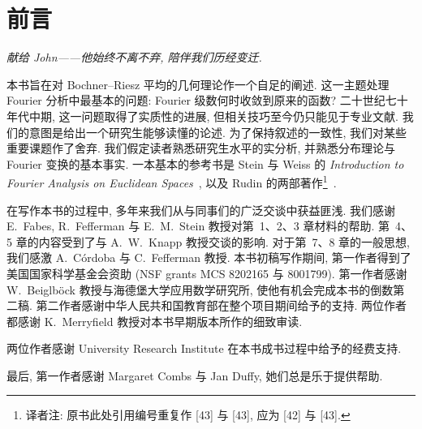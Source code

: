 \chapter*{前言}

\begin{center}
\itshape 献给 John——他始终不离不弃, 陪伴我们历经变迁.
\end{center}

\vspace{2em}

本书旨在对 Bochner--Riesz 平均的几何理论作一个自足的阐述. 这一主题处理 Fourier 分析中最基本的问题: Fourier 级数何时收敛到原来的函数? 二十世纪七十年代中期, 这一问题取得了实质性的进展, 但相关技巧至今仍只能见于专业文献. 我们的意图是给出一个研究生能够读懂的论述. 为了保持叙述的一致性, 我们对某些重要课题作了舍弃. 我们假定读者熟悉研究生水平的实分析, 并熟悉分布理论与 Fourier 变换的基本事实. 一本基本的参考书是 Stein 与 Weiss 的 \emph{Introduction to Fourier Analysis on Euclidean Spaces}~\cite{steinweiss}, 以及 Rudin 的两部著作\footnote{译者注: 原书此处引用编号重复作 [43] 与 [43], 应为 [42] 与 [43].}~\cite{rudinrca,rudinfa}.

在写作本书的过程中, 多年来我们从与同事们的广泛交谈中获益匪浅. 我们感谢 E.~Fabes, R.~Fefferman 与 E.~M.~Stein 教授对第~1、2、3 章材料的帮助. 第~4、5 章的内容受到了与 A.~W.~Knapp 教授交谈的影响. 对于第~7、8 章的一般思想, 我们感激 A.~Córdoba 与 C.~Fefferman 教授. 本书初稿写作期间, 第一作者得到了美国国家科学基金会资助 (NSF grants MCS 8202165 与 8001799). 第一作者感谢 W.~Beiglböck 教授与海德堡大学应用数学研究所, 使他有机会完成本书的倒数第二稿. 第二作者感谢中华人民共和国教育部在整个项目期间给予的支持. 两位作者都感谢 K.~Merryfield 教授对本书早期版本所作的细致审读.

两位作者感谢 University Research Institute 在本书成书过程中给予的经费支持.

最后, 第一作者感谢 Margaret Combs 与 Jan Duffy, 她们总是乐于提供帮助.

